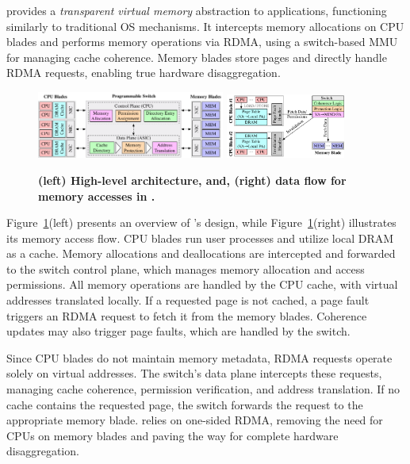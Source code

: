 \mind provides a \textit{transparent virtual memory} abstraction to applications, functioning similarly to traditional OS mechanisms. It intercepts memory allocations on CPU blades and performs memory operations via RDMA, using a switch-based MMU for managing cache coherence. Memory blades store pages and directly handle RDMA requests, enabling true hardware disaggregation. 

\begin{figure}[!t]
\centering
\includegraphics[width=0.55\textwidth]{fig/mind/design}\hspace{3em}
\includegraphics[width=0.35\textwidth]{fig/mind/data_flow}%
\vspace{-0.5em}
\caption[High-level \mind architecture and data flow for memory accesses in \mind]{\textbf{(left) High-level \mind architecture, and, (right) data flow for memory accesses in \mind.}}
\label{fig:system_diagram}
\end{figure}

Figure~\ref{fig:system_diagram}(left) presents an overview of \mind's design, while Figure~\ref{fig:system_diagram}(right) illustrates its memory access flow. CPU blades run user processes and utilize local DRAM as a cache. Memory allocations and deallocations are intercepted and forwarded to the switch control plane, which manages memory allocation and access permissions. All memory operations are handled by the CPU cache, with virtual addresses translated locally. If a requested page is not cached, a page fault triggers an RDMA request to fetch it from the memory blades. Coherence updates may also trigger page faults, which are handled by the switch. 

Since CPU blades do not maintain memory metadata, RDMA requests operate solely on virtual addresses. The switch's data plane intercepts these requests, managing cache coherence, permission verification, and address translation. If no cache contains the requested page, the switch forwards the request to the appropriate memory blade. \mind relies on one-sided RDMA, removing the need for CPUs on memory blades and paving the way for complete hardware disaggregation.


